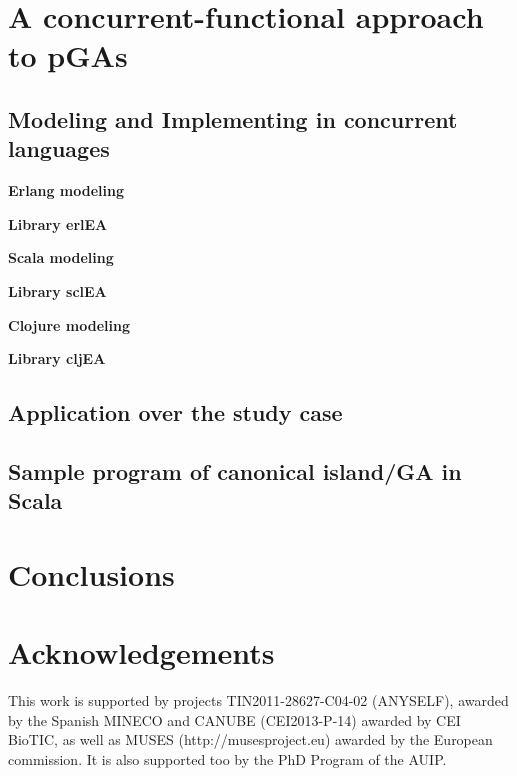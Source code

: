\documentclass[9pt, technote]{IEEEtran}
\newcommand{\simpleEntry}[1]
{
\vspace{.3cm}
\noindent \textbf{#1}
\vspace{.3cm}
}
\begin{document}
\section{A concurrent-functional approach to pGAs}
\label{sec:design}
    

\subsection{Modeling and Implementing in concurrent languages}
\label{sec:impl}
    

\simpleEntry{Erlang modeling}
    

\simpleEntry{Library erlEA}
    

\simpleEntry{Scala modeling}
    

\simpleEntry{Library sclEA}
    

\simpleEntry{Clojure modeling}
    

\simpleEntry{Library cljEA}
    

\subsection{Application over the study case} \label{sec:results}%
    

\subsection{Sample program of canonical island/GA in Scala}\label{sec:sample}


\section{Conclusions}
\label{sec:conclusions}
    


\section{Acknowledgements}

This work is supported by projects TIN2011-28627-C04-02 (ANYSELF),
awarded by the Spanish MINECO and CANUBE (CEI2013-P-14) awarded by CEI
BioTIC, as well as MUSES (http://musesproject.eu) awarded by the
European commission. It is also supported too by the PhD
Program of the AUIP.




\end{document}
